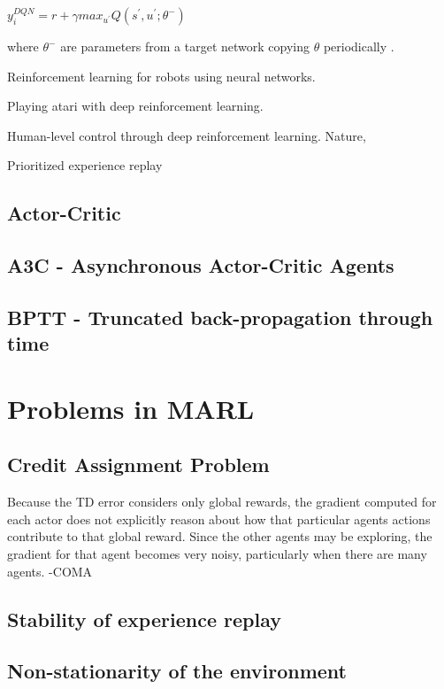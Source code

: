 \begin{center}
	$ y_i^{DQN} = r + \gamma max_{u^{'}}Q(s^{'},u^{'};\theta^-) $
\end{center}

where $\theta^-$ are parameters from a target network copying $\theta$ periodically
.\newline 
 
Reinforcement learning for robots using neural networks. 

Playing atari with deep reinforcement learning.

Human-level control through deep reinforcement learning. Nature,

Prioritized experience replay

\subsection{Actor-Critic}

\subsection{A3C - Asynchronous Actor-Critic Agents}

\subsection{BPTT - Truncated back-propagation through time }
%
%
%
\section{Problems in MARL}
%
%
%
\subsection{Credit Assignment Problem}

Because the TD error considers only
global rewards, the gradient computed for each actor does
not explicitly reason about how that particular agents actions
contribute to that global reward. Since the other agents
may be exploring, the gradient for that agent becomes very
noisy, particularly when there are many agents. -COMA

\subsection{Stability of experience replay}

\subsection{Non-stationarity of the environment}

